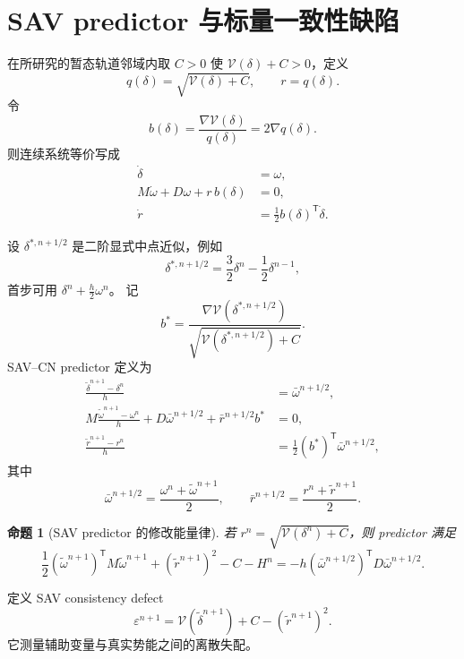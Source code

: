 \documentclass[UTF8,11pt,a4paper]{ctexart}
\newtheorem{proposition}[theorem]{命题}
\theoremstyle{definition}
\theoremstyle{remark}
\newcommand{\T}{\mathsf{T}}
\newcommand{\V}{\mathcal V}
\newcommand{\wt}{\widetilde}
\begin{document}
\section{SAV predictor 与标量一致性缺陷}

在所研究的暂态轨道邻域内取 \(C>0\) 使
\(
 \V(\delta)+C>0
\)，定义
\begin{equation}
 q(\delta)=\sqrt{\V(\delta)+C},
 \qquad
 r=q(\delta).
\end{equation}
令
\[
 b(\delta)=\frac{\nabla\V(\delta)}{q(\delta)}=2\nabla q(\delta).
\]
则连续系统等价写成
\begin{align}
 \dot\delta&=\omega,\\
 M\dot\omega+D\omega+r\,b(\delta)&=0,\\
 \dot r&=\frac12 b(\delta)^\T\dot\delta.
\end{align}

设 \(\delta^{*,n+1/2}\) 是二阶显式中点近似，例如
\[
 \delta^{*,n+1/2}
 =
 \frac32\delta^n-\frac12\delta^{n-1},
\]
首步可用
\(
 \delta^n+\frac h2\omega^n
\)。
记
\[
 b^*=
 \frac{\nabla\V(\delta^{*,n+1/2})}
 {\sqrt{\V(\delta^{*,n+1/2})+C}}.
\]
SAV--CN predictor 定义为
\begin{align}
 \frac{\wt\delta^{n+1}-\delta^n}{h}
 &=
 \bar\omega^{n+1/2},
 \label{eq:sav-delta}\\
 M\frac{\wt\omega^{n+1}-\omega^n}{h}
 +D\bar\omega^{n+1/2}
 +\bar r^{n+1/2}b^*
 &=0,
 \label{eq:sav-omega}\\
 \frac{\wt r^{n+1}-r^n}{h}
 &=
 \frac12(b^*)^\T\bar\omega^{n+1/2},
 \label{eq:sav-r}
\end{align}
其中
\[
 \bar\omega^{n+1/2}
 =\frac{\omega^n+\wt\omega^{n+1}}2,
 \qquad
 \bar r^{n+1/2}
 =\frac{r^n+\wt r^{n+1}}2.
\]

\begin{proposition}[SAV predictor 的修改能量律]
若 \(r^n=\sqrt{\V(\delta^n)+C}\)，则 predictor 满足
\begin{equation}
 \frac12(\wt\omega^{n+1})^\T M\wt\omega^{n+1}
 +(\wt r^{n+1})^2-C
 -H^n
 =
 -h(\bar\omega^{n+1/2})^\T D\bar\omega^{n+1/2}.
 \label{eq:sav-modified-law}
\end{equation}
\end{proposition}

定义 SAV consistency defect
\begin{equation}
 \boxed{
 \varepsilon^{n+1}
 =
 \V(\wt\delta^{n+1})+C-(\wt r^{n+1})^2 .}
 \label{eq:epsilon}
\end{equation}
它测量辅助变量与真实势能之间的离散失配。
\end{document}
